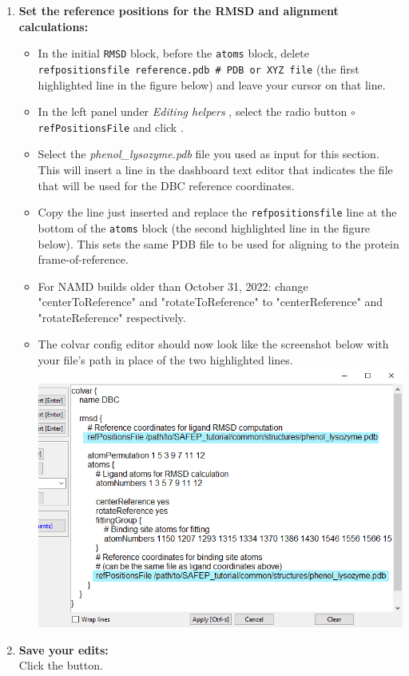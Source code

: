 \documentclass[9pt,tutorial]{Styling/livecoms}
\newcommand{\filepath}[1]{\textit{#1}}
\newcommand{\button}[1]{
  \inlineBox[gray]{\texttt{#1}}
}
\newcommand{\menu}[1]{
  \textit{#1}
}
\newcommand{\option}[1]{
  \texttt{#1}
}
\newcommand{\textInput}[1]{
  \texttt{#1}
}
\begin{document}
\begin{enumerate}
\begin{enumerate}[label=\alph*., ref=\theenumi.\alph*]
             \item \textbf{Set the reference positions for the RMSD and alignment calculations:} 
             \begin{itemize}
                 \item In the initial \textInput{RMSD} block, before the \textInput{atoms} block, delete \textInput{refpositionsfile reference.pdb \# PDB or XYZ file} (the first highlighted line in the figure below) and leave your cursor on that line.
                \item In the left panel under \menu{Editing helpers}, select the radio button \option{$\circ$  refPositionsFile} and click \button{Pick File}. 
                \item Select the \filepath{phenol\_lysozyme.pdb} file you used as input for this section. This will insert a line in the dashboard text editor that indicates the file that will be used for the DBC reference coordinates.
                \item Copy the line just inserted and replace the \textInput{refpositionsfile} line at the bottom of the \textInput{atoms} block (the second highlighted line in the figure below). This sets the same PDB file to be used for aligning to the protein frame-of-reference.
                \item For NAMD builds older than October 31, 2022: change "centerToReference" and "rotateToReference" to "centerReference" and "rotateReference" respectively.
                \item The colvar config editor should now look like the screenshot below with your file's path in place of the two highlighted lines.\\
                \includegraphics[width=0.75\linewidth ]{Figures/CV_dashboard_StepA.png} \label{fig:refposfiles}
            \end{itemize}
            \item \textbf{Save your edits:}\\
            Click the \button{Apply [Ctrl-s]} button.
        \end{enumerate}
        

\end{enumerate}
\end{document}
